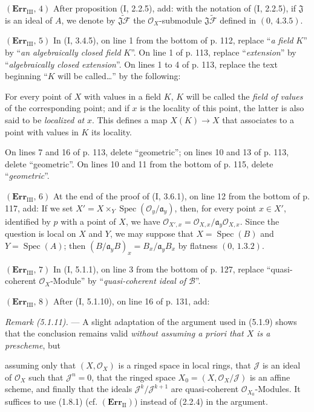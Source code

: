 \documentclass[10pt,oneside]{book}
\newcommand{\sh}[1]{\mathscr{#1}}
\newcommand{\Spec}{\operatorname{Spec}}
\newcommand{\oldpage}[2][]{\setcounter{footnote}{0}\marginpar{\scriptsize\textbf{#1}~|~#2}\ignorespaces}
\begin{document}
\noindent\textbf{$(\mathbf{Err}_{\mathrm{III}},\,4)$} After proposition (I,
2.2.5), add: with the notation of (I, 2.2.5), if $\mathfrak J$ is an ideal of
$A$, we denote by $\widetilde{\mathfrak J\sh{F}}$ the
$\sh{O}_X$-submodule $\mathfrak J\widetilde{\sh{F}}$ defined in
$(0,\,4.3.5)$.

\noindent\textbf{$(\mathbf{Err}_{\mathrm{III}},\,5)$} In (I, 3.4.5), on line
1 from the bottom of p. 112, replace ``\emph{a field} $K$'' by ``\emph{an
algebraically closed field} $K$''. On line 1 of p. 113, replace
``\emph{extension}'' by ``\emph{algebraically closed extension}''. On lines 1
to 4 of p. 113, replace the text beginning ``$K$ will be called\ldots{}'' by
the following:

For every point of $X$ with values in a field $K$, $K$ will be called the
\emph{field of values} of the corresponding point; and if $x$ is the locality
of this point, the latter is also said to be \emph{localized at} $x$. This
defines a map $X(K)\to X$ that associates to a point with values in $K$ its
locality.

On lines 7 and 16 of p. 113, delete ``geometric''; on lines 10 and 13 of p.
113, delete ``geometric''. On lines 10 and 11 from the bottom of p. 115,
delete ``\emph{geometric}''.

\noindent\textbf{$(\mathbf{Err}_{\mathrm{III}},\,6)$} At the end of the proof
of (I, 3.6.1), on line 12 from the bottom of p. 117, add: If we set
$X'=X\times_Y\Spec(\sh{O}_y/\mathfrak a_y)$, then, for every point $x\in X'$,
identified by $p$ with a point of $X$, we have
$\sh{O}_{X',x}=\sh{O}_{X,x}/\mathfrak a_y\sh{O}_{X,x}$. Since the question is
local on $X$ and $Y$, we may suppose that $X=\Spec(B)$ and $Y=\Spec(A)$; then
$(B/\mathfrak a_yB)_x=B_x/\mathfrak a_yB_x$ by flatness $(0,\,1.3.2)$.

\noindent\textbf{$(\mathbf{Err}_{\mathrm{III}},\,7)$} In (I, 5.1.1), on line
3 from the bottom of p. 127, replace ``quasi-coherent $\sh{O}_X$-Module'' by
``\emph{quasi-coherent ideal of} $\sh{B}$''.

\noindent\textbf{$(\mathbf{Err}_{\mathrm{III}},\,8)$} After (I, 5.1.10), on
line 16 of p. 131, add:

\emph{Remark (5.1.11).} --- A slight adaptation of the argument used in
(5.1.9) shows that the conclusion remains valid \emph{without assuming a
priori that $X$ is a prescheme}, but

\oldpage[III]{220}
assuming only that $(X,\sh{O}_X)$ is a ringed space in local rings, that
$\sh{J}$ is an ideal of $\sh{O}_X$ such that $\sh{J}^n=0$, that the ringed
space $X_0=(X,\sh{O}_X/\sh{J})$ is an affine scheme, and finally that the
ideals $\sh{J}^k/\sh{J}^{k+1}$ are quasi-coherent $\sh{O}_{X_0}$-Modules. It
suffices to use (1.8.1) (cf. $(\mathbf{Err}_{\mathrm{II}})$) instead of
(2.2.4) in the argument.
\end{document}
